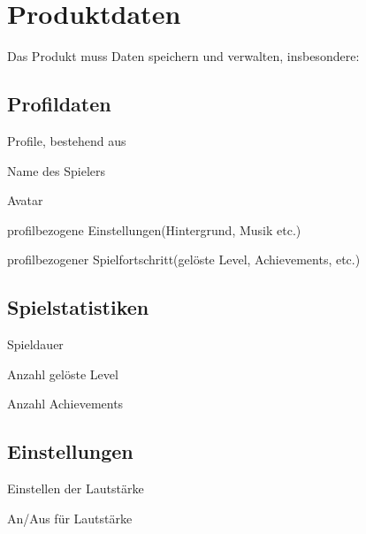 \documentclass{scrartcl}
\begin{document}
\section{Produktdaten}
Das Produkt muss Daten speichern und verwalten, insbesondere: 

\subsection{Profildaten}

\begin{pdlist}
    \item \label{produktdaten:profile} Profile, bestehend aus 
    \begin{pdlist}
        \item \label{produktdaten:profile:name}Name des Spielers
        \item \label{produktdaten:profile:avatar}Avatar
        \item \label{produktdaten:profile:einstellungen}profilbezogene Einstellungen(Hintergrund, Musik etc.) 
        \item \label{produktdaten:profile:spielfortschritt}profilbezogener Spielfortschritt(gelöste Level, Achievements, etc.)
    \end{pdlist}
\end{pdlist}

\subsection{Spielstatistiken}
\label{produktdaten:spielestatistiken}

\begin{pdlist}[resume]
    \item Spieldauer
    \item Anzahl gelöste Level
    \item Anzahl Achievements
\end{pdlist}

\subsection{Einstellungen}
\label{produktdaten:einstellungen}

\begin{pdlist}[resume]
	\item Einstellen der Lautstärke
	\item An/Aus für Lautstärke
\end{pdlist}

\clearpage
\end{document}
